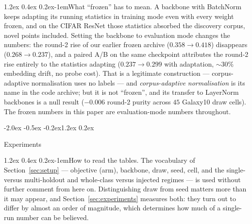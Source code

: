 \documentclass{article}
\makeatletter
\renewcommand\section{\@startsection{section}{1}{\z@}%
  {-2.0ex \@plus -0.5ex \@minus -0.2ex}{1.2ex \@plus 0.2ex}%
  {\large\bf\raggedright}}
\renewcommand\paragraph{\@startsection{paragraph}{4}{\z@}%
  {1.2ex \@plus 0.4ex \@minus 0.2ex}{-1em}{\normalsize\bf}}
\makeatother
\begin{document}
\paragraph{What ``frozen'' has to mean.} A backbone with BatchNorm keeps
adapting its running statistics in training mode even with every weight
frozen, and on the CIFAR ResNet those statistics absorbed the discovery
corpus, novel points included. Setting the backbone to evaluation mode changes
the numbers: the round-2 rise of our earlier frozen archive
($0.358 \to 0.418$) disappears ($0.268 \to 0.237$), and a paired A/B on the
same checkpoint attributes the round-2 rise entirely to the statistics
adapting ($0.237 \to 0.299$ with adaptation, $\sim$$30\%$ embedding drift,
no probe cost). That is a legitimate construction --- corpus-adaptive
normalisation uses no labels --- and \emph{corpus-adaptive normalisation} is its name in the code archive; but it is not
``frozen'', and its transfer to LayerNorm backbones is a null result
($-0.006$ round-2 purity across $45$ Galaxy10 draw cells). The frozen numbers
in this paper are evaluation-mode numbers throughout.

\section{Experiments}
\label{sec:experiments}

\paragraph{How to read the tables.}
The vocabulary of Section~\ref{sec:setup} --- objective (arm), backbone, draw, seed, cell,
and the single- versus multi-holdout and whole-class versus injected regimes
--- is used without further comment from here on. Distinguishing
draw from seed matters more than it may appear, and
Section~\ref{sec:experiments} measures both: they turn out to differ by almost
an order of magnitude, which determines how much of a single-run number can be
believed.
\end{document}
